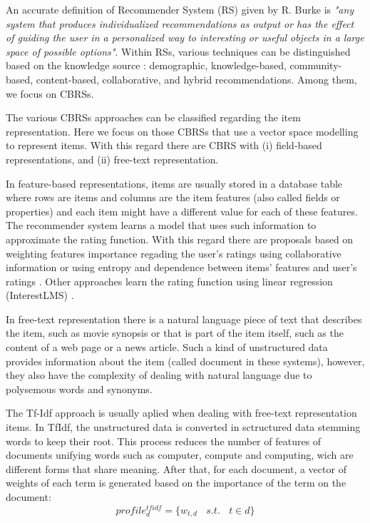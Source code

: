 \documentclass[preprint]{elsarticle}
\begin{document}
\begin{spacing}{1.5}
An accurate definition of Recommender System (RS) given by R. Burke \cite{Burke2002} is \emph{"any system that produces individualized recommendations as output or has the effect of guiding the user in a personalized way to interesting or useful objects in a large space of possible options"}. Within RSs, various techniques can be distinguished based on the knowledge source \cite{DePessemier2016}: demographic, knowledge-based, community-based, content-based, collaborative, and hybrid recommendations. Among them, we focus on CBRSs.

The various CBRSs approaches can be classified regarding the item representation. Here we focus on those CBRSs that use a vector space modelling to represent items. With this regard there are CBRS with (i) field-based representations, and (ii) free-text representation. 

In feature-based representations, items are usually stored in a database table where rows are items and columns are the item features (also called fields or properties) and each item might have a different value for each of these features. The recommender system learns a model that uses such information to approximate the rating function. With this regard there are proposals based on weighting features importance regading the user's ratings using collaborative information \cite{Symeonidis2007} or using entropy and dependence between items' features and user's ratings \cite{Castro2014}. Other approaches learn the rating function using linear regression (InterestLMS) \cite{DePessemier2016}.

In free-text representation there is a natural language piece of text that describes the item, such as movie synopsis or that is part of the item itself, such as the content of a web page or a news article. Such a kind of unstructured data provides information about the item (called document in these systems), however, they also have the complexity of dealing with natural language due to polysemous words and synonyms. 

The Tf-Idf approach is usually aplied when dealing with free-text representation items. In TfIdf, the unstructured data is converted in sctructured data stemming words \cite{Porter1980} to keep their root. This process reduces the number of features of documents unifying words such as computer, compute and computing, wich are different forms that share meaning. After that, for each document, a vector of weights of each term is generated based on the importance of the term on the document:
\begin{equation}
	profile^{tfidf}_{d} = \{w_{t,d}~~~~s.t.~~~~ t \in d \}
	\label{eq:document-profile-tfidf}
\end{equation}


\end{spacing}
\end{document}

